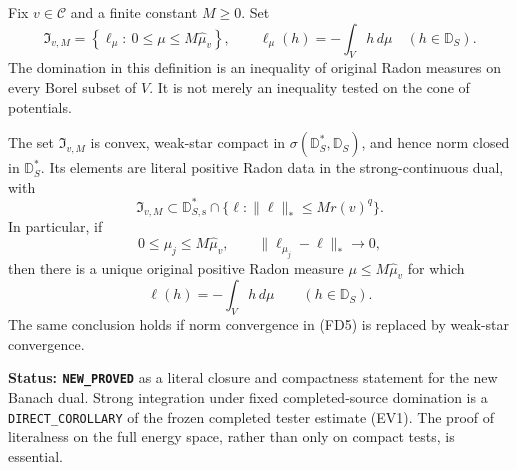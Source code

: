 Fix $v\in\mathscr C$ and a finite constant $M\geq0$. Set
\[
 \mathfrak I_{v,M}
  =\left\{\ell_\mu:\ 0\leq\mu\leq M\widehat\mu_v\right\},
 \qquad
 \ell_\mu(h)=-\int_Vh\,d\mu\quad(h\in\mathbb D_S).
 \tag{FD3}
\]
The domination in this definition is an inequality of original
Radon measures on every Borel subset of $V$. It is not merely
an inequality tested on the cone of potentials.

\begin{theorem}
\label{thm:r12-fixed-domination-literal-closure}
The set $\mathfrak I_{v,M}$ is convex, weak-star compact in
$\sigma(\mathbb D_S^*,\mathbb D_S)$, and hence norm closed in
$\mathbb D_S^*$. Its elements are literal positive Radon data
in the strong-continuous dual, with
\[
 \mathfrak I_{v,M}\subset\mathbb D_{S,\mathrm s}^*\cap
       \{\ell:\|\ell\|_*\leq M r(v)^q\}.
 \tag{FD4}
\]
In particular, if
\[
 0\leq\mu_j\leq M\widehat\mu_v,\qquad
       \|\ell_{\mu_j}-\ell\|_*\longrightarrow0,
 \tag{FD5}
\]
then there is a unique original positive Radon measure
$\mu\leq M\widehat\mu_v$ for which
\[
                    \ell(h)=-\int_Vh\,d\mu
                       \qquad(h\in\mathbb D_S).
 \tag{FD6}
\]
The same conclusion holds if norm convergence in
\textup{(FD5)} is replaced by weak-star convergence.
\end{theorem}

\noindent\textbf{Status: \texttt{NEW\_PROVED}} as a literal
closure and compactness statement for the new Banach dual.
Strong integration under fixed completed-source domination is a
\texttt{DIRECT\_COROLLARY} of the frozen completed tester
estimate \textup{(EV1)}. The proof of literalness on the full
energy space, rather than only on compact tests, is essential.

